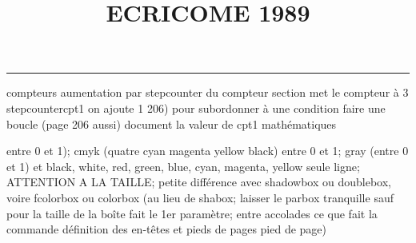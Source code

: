 \documentclass[11pt]{article}%
\title{\bf \vspace{-2cm} ECRICOME 1989} %
\author{} %
\date{} %
\renewcommand{\headrulewidth}{0pt}%
\renewcommand{\footrulewidth}{0.4pt}%
\begin{document}
\maketitle %
\vspace{-1.4cm}\hrule %
\thispagestyle{fancy}

\vspace*{.2cm}



compteurs%
aumentation par stepcounter du compteur section%
met le compteur à 3%
stepcounter{cpt1} on ajoute 1%
206) pour subordonner à une condition %
faire une boucle (page 206 aussi) %
document la valeur de cpt1 
mathématiques\newcommand{\ch}{\operatorname{ch}} 
\newcommand{\sh}{\operatorname{sh}}
\renewcommand{\tanh}{\operatorname{th}}
\renewcommand{\sinh}{\operatorname{sh}}
\renewcommand{\cosh}{\operatorname{ch}}
\newcommand{\argsh}{\operatorname{argsh}}
\newcommand{\argch}{\operatorname{argch}}
\newcommand{\argth}{\operatorname{argth}}
\newcommand{\Id}{\operatorname{Id}}
\renewcommand{\leq}{\leq}
\renewcommand{\geq}{\geq }

\newcommand{\dlim}{\lim}
\newcommand{\dsum}{\sum}
\newcommand{\dint}{\int}
\newcommand{\dprod}{\prod}



entre 0 et 1); cmyk (quatre cyan magenta yellow black) entre 0 et 1;
gray (entre 0 et 1) et black, white, red, green, blue, cyan, magenta,
yellow%
seule ligne; ATTENTION A LA TAILLE; petite différence avec shadowbox ou
doublebox, voire fcolorbox ou colorbox (au lieu de shabox; laisser le
parbox tranquille sauf pour la taille de la boîte
\newcommand{\Tbox}[1]{\begin{center} \shabox{\parbox{0.6
\linewidth}{#1}} \end{center}} %
fait le 1er paramètre; entre accolades ce que fait la commande
définition des en-têtes et pieds de pages\pagestyle{fancy}
\chead{}
\rfoot[ \ \thepage]{\thepage}
\cfoot{}
\lfoot{}
\thispagestyle{fancy} %
pied de page)\renewcommand{\footrulewidth}{0.4pt}
\renewcommand{\headrulewidth}{0.4pt}
\end{document}
